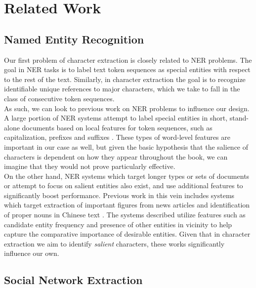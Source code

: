 \documentclass[12pt]{article}
\begin{document}

\section{Related Work}
\subsection{Named Entity Recognition}

    Our first problem of character extraction is closely related to NER problems. The goal in NER tasks
    is to label text token sequences as special entities with respect to the rest of the text. Similarly, in 
    character extraction the goal is to recognize identifiable unique references to major characters, which
    we take to fall in the class of consecutive token sequences. \\

    As such, we can look to previous work on NER problems to influence our design. A large portion of NER systems
    attempt to label special entities in short, stand-alone documents based on local features for token
    sequences, such as capitalization, prefixes and suffixes \cite{nadeau2007survey}. These types of word-level
    features are important in our case as well, but given the basic hypothesis that the salience of characters 
    is dependent on how they appear throughout the book, we can imagine that they would not prove particularly 
    effective. \\

    On the other hand, NER systems which target longer types or sets of documents or attempt to focus on
    salient entities also exist, and use additional features to significantly boost performance. 
    Previous work in this vein includes systems which target extraction of important figures 
    from news articles \cite{zhang2004focused} and identification of proper nouns in Chinese text \cite{chen1996identification}.
    The systems described utilize features such as candidate entity frequency and presence of other
    entities in vicinity to help capture the comparative importance of desirable entities. Given that in 
    character extraction we aim to identify \emph{salient} characters, these works significantly influence
    our own. \\

\subsection{Social Network Extraction}
\end{document}
